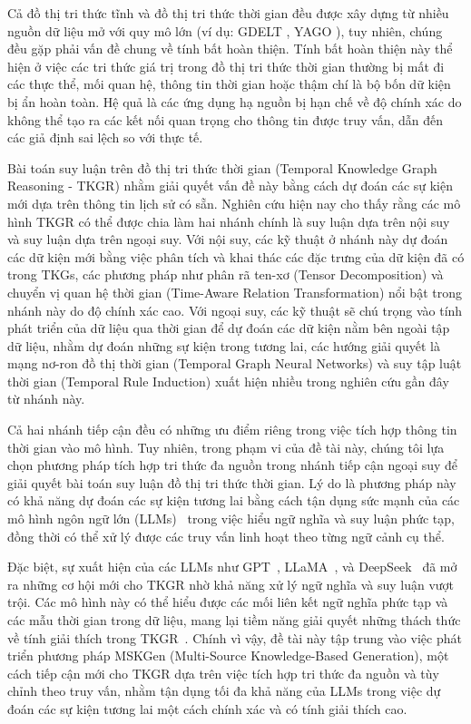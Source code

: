 Cả đồ thị tri thức tĩnh và đồ thị tri thức thời gian đều được xây dựng từ nhiều nguồn dữ liệu mở với quy mô lớn (ví dụ: GDELT \cite{ref_article20}, YAGO \cite{ref_article21}), tuy nhiên, chúng đều gặp phải vấn đề chung về tính bất hoàn thiện. Tính bất hoàn thiện này thể hiện ở việc các tri thức giá trị trong đồ thị tri thức thời gian thường bị mất đi các thực thể, mối quan hệ, thông tin thời gian hoặc thậm chí là bộ bốn dữ kiện bị ẩn hoàn toàn. Hệ quả là các ứng dụng hạ nguồn bị hạn chế về độ chính xác do không thể tạo ra các kết nối quan trọng cho thông tin được truy vấn, dẫn đến các giả định sai lệch so với thực tế.

Bài toán suy luận trên đồ thị tri thức thời gian (Temporal Knowledge Graph Reasoning - TKGR) nhằm giải quyết vấn đề này bằng cách dự đoán các sự kiện mới dựa trên thông tin lịch sử có sẵn. Nghiên cứu hiện nay cho thấy rằng các mô hình TKGR có thể được chia làm hai nhánh chính là suy luận dựa trên nội suy và suy luận dựa trên ngoại suy. Với nội suy, các kỹ thuật ở nhánh này dự đoán các dữ kiện mới bằng việc phân tích và khai thác các đặc trưng của dữ kiện đã có trong TKGs, các phương pháp như phân rã ten-xơ (Tensor Decomposition) và chuyển vị quan hệ thời gian (Time-Aware Relation Transformation) nổi bật trong nhánh này do độ chính xác cao. Với ngoại suy, các kỹ thuật sẽ chú trọng vào tính phát triển của dữ liệu qua thời gian để dự đoán các dữ kiện nằm bên ngoài tập dữ liệu, nhằm dự đoán những sự kiện trong tương lai, các hướng giải quyết là mạng nơ-ron đồ thị thời gian (Temporal Graph Neural Networks) và suy tập luật thời gian (Temporal Rule Induction) xuất hiện nhiều trong nghiên cứu gần đây từ nhánh này.

Cả hai nhánh tiếp cận đều có những ưu điểm riêng trong việc tích hợp thông tin thời gian vào mô hình. Tuy nhiên, trong phạm vi của đề tài này, chúng tôi lựa chọn phương pháp tích hợp tri thức đa nguồn trong nhánh tiếp cận ngoại suy để giải quyết bài toán suy luận đồ thị tri thức thời gian. Lý do là phương pháp này có khả năng dự đoán các sự kiện tương lai bằng cách tận dụng sức mạnh của các mô hình ngôn ngữ lớn (LLMs)~\cite{ref_article04} trong việc hiểu ngữ nghĩa và suy luận phức tạp, đồng thời có thể xử lý được các truy vấn linh hoạt theo từng ngữ cảnh cụ thể.

Đặc biệt, sự xuất hiện của các LLMs như GPT~\cite{ref_article05}, LLaMA~\cite{ref_article06}, và DeepSeek~\cite{ref_article07} đã mở ra những cơ hội mới cho TKGR nhờ khả năng xử lý ngữ nghĩa và suy luận vượt trội. Các mô hình này có thể hiểu được các mối liên kết ngữ nghĩa phức tạp và các mẫu thời gian trong dữ liệu, mang lại tiềm năng giải quyết những thách thức về tính giải thích trong TKGR~\cite{ref_article03}. Chính vì vậy, đề tài này tập trung vào việc phát triển phương pháp MSKGen (Multi-Source Knowledge-Based Generation), một cách tiếp cận mới cho TKGR dựa trên việc tích hợp tri thức đa nguồn và tùy chỉnh theo truy vấn, nhằm tận dụng tối đa khả năng của LLMs trong việc dự đoán các sự kiện tương lai một cách chính xác và có tính giải thích cao.


